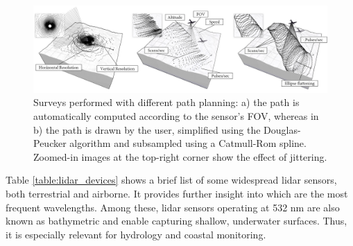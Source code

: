 \begin{figure}[ht]
	\includegraphics[width=\linewidth]{figs/fundamentals/lidar_patterns.png}
	\caption{Surveys performed with different path planning: a) the path is automatically computed according to the sensor's FOV, whereas in b) the path is drawn by the user, simplified using the Douglas-Peucker algorithm and subsampled using a Catmull-Rom spline. Zoomed-in images at the top-right corner show the effect of jittering. }
    \label{fig:lidar_patterns}
\end{figure}

Table \ref{table:lidar_devices} shows a brief list of some widespread \acrshort{lidar} sensors, both terrestrial and airborne. It provides further insight into which are the most frequent wavelengths. Among these, \acrshort{lidar} sensors operating at 532 \si{\nano\meter} are also known as bathymetric and enable capturing shallow, underwater surfaces. Thus, it is especially relevant for hydrology and coastal monitoring.

